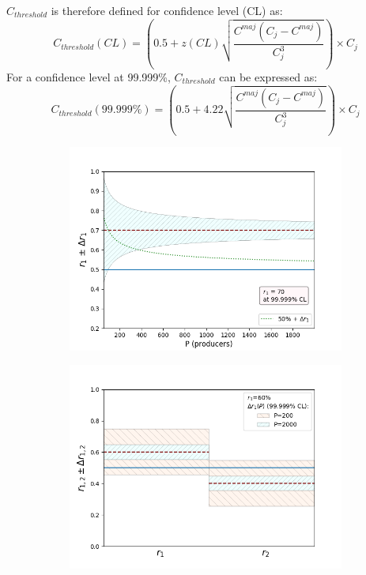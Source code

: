 \begin{enumerate}
 $C_{threshold}$ is therefore defined for confidence level (CL) as:  
 \begin{equation}
 C_{threshold}(CL) = \left( 0.5 +  z(CL)\sqrt{\frac{C^{maj}(C_j-C^{maj})}{C_j^3}} \right) \times C_j
 \end{equation}
 For a confidence level at 99.999\%, $C_{threshold}$ can be expressed as:
  \begin{equation}
 C_{threshold}(99.999\%) = \left( 0.5 +  4.22\sqrt{\frac{C^{maj}(C_j-C^{maj})}{C_j^3}} \right) \times C_j
 \end{equation}
 
 \begin{figure}[H]
 \centering
    \begin{subfigure}[b]{0.45\textwidth}
        \includegraphics[width=\textwidth]{Figures/r_over_P_at_70}
        \label{fig:rrdeltarb}
    \end{subfigure}
    \begin{subfigure}[b]{0.45\textwidth}
        \includegraphics[width=\textwidth]{Figures/r_pm_deltar_at_60}
        \label{fig:rdeltara}
    \end{subfigure}
    \vspace*{-0.2in}
    

\end{figure}
\end{enumerate}
